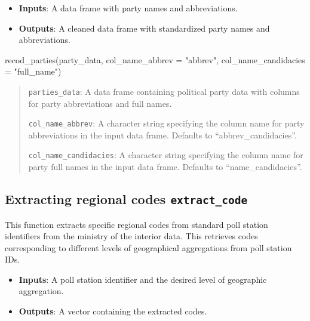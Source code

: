 \documentclass[
  letterpaper,
  DIV=11,
  numbers=noendperiod]{scrreprt}
\newenvironment{Shaded}{\begin{snugshade}}{\end{snugshade}}
\newcommand{\AttributeTok}[1]{\textcolor[rgb]{0.40,0.45,0.13}{#1}}
\newcommand{\FunctionTok}[1]{\textcolor[rgb]{0.28,0.35,0.67}{#1}}
\newcommand{\NormalTok}[1]{\textcolor[rgb]{0.00,0.23,0.31}{#1}}
\newcommand{\StringTok}[1]{\textcolor[rgb]{0.13,0.47,0.30}{#1}}
\providecommand{\tightlist}{%
  \setlength{\itemsep}{0pt}\setlength{\parskip}{0pt}}\usepackage{longtable,booktabs,array}
\begin{document}
\begin{itemize}
\tightlist
\item
  \textbf{Inputs}: A data frame with party names and abbreviations.
\item
  \textbf{Outputs}: A cleaned data frame with standardized party names
  and abbreviations.
\end{itemize}

\begin{Shaded}
\begin{Highlighting}[]
\FunctionTok{recod\_parties}\NormalTok{(party\_data, }\AttributeTok{col\_name\_abbrev =} \StringTok{"abbrev"}\NormalTok{, }\AttributeTok{col\_name\_candidacies =} \StringTok{"full\_name"}\NormalTok{)}
\end{Highlighting}
\end{Shaded}

\begin{quote}
\texttt{parties\_data}: A data frame containing political party data
with columns for party abbreviations and full names.

\texttt{col\_name\_abbrev}: A character string specifying the column
name for party abbreviations in the input data frame. Defaults to
``abbrev\_candidacies''.

\texttt{col\_name\_candidacies}: A character string specifying the
column name for party full names in the input data frame. Defaults to
``name\_candidacies''.
\end{quote}

\hypertarget{extracting-regional-codes-extract_code}{%
\subsection{\texorpdfstring{Extracting regional codes
\texttt{extract\_code}}{Extracting regional codes extract\_code}}\label{extracting-regional-codes-extract_code}}

This function extracts specific regional codes from standard poll
station identifiers from the ministry of the interior data. This
retrieves codes corresponding to different levels of geographical
aggregations from poll station IDs.

\begin{itemize}
\tightlist
\item
  \textbf{Inputs}: A poll station identifier and the desired level of
  geographic aggregation.
\item
  \textbf{Outputs}: A vector containing the extracted codes.
\end{itemize}
\end{document}
